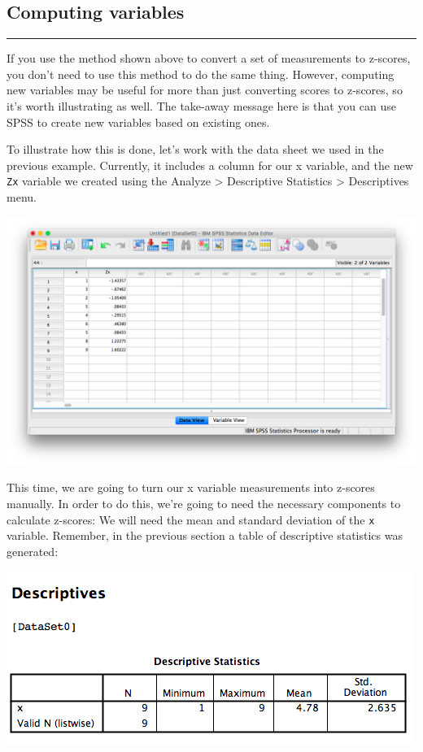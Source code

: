 \documentclass[
]{book}
\begin{document}
\hypertarget{computing-variables}{%
\subsection{Computing variables}\label{computing-variables}}

\begin{center}\rule{0.5\linewidth}{0.5pt}\end{center}

If you use the method shown above to convert a set of measurements to z-scores, you don't need to use this method to do the same thing. However, computing new variables may be useful for more than just converting scores to z-scores, so it's worth illustrating as well. The take-away message here is that you can use SPSS to create new variables based on existing ones.

To illustrate how this is done, let's work with the data sheet we used in the previous example. Currently, it includes a column for our x variable, and the new \texttt{Zx} variable we created using the Analyze \textgreater{} Descriptive Statistics \textgreater{} Descriptives menu.

\includegraphics{img/4.4.15.png}

This time, we are going to turn our x variable measurements into z-scores manually. In order to do this, we're going to need the necessary components to calculate z-scores: We will need the mean and standard deviation of the \texttt{x} variable. Remember, in the previous section a table of descriptive statistics was generated:

\includegraphics{img/4.4.14.png}
\end{document}
